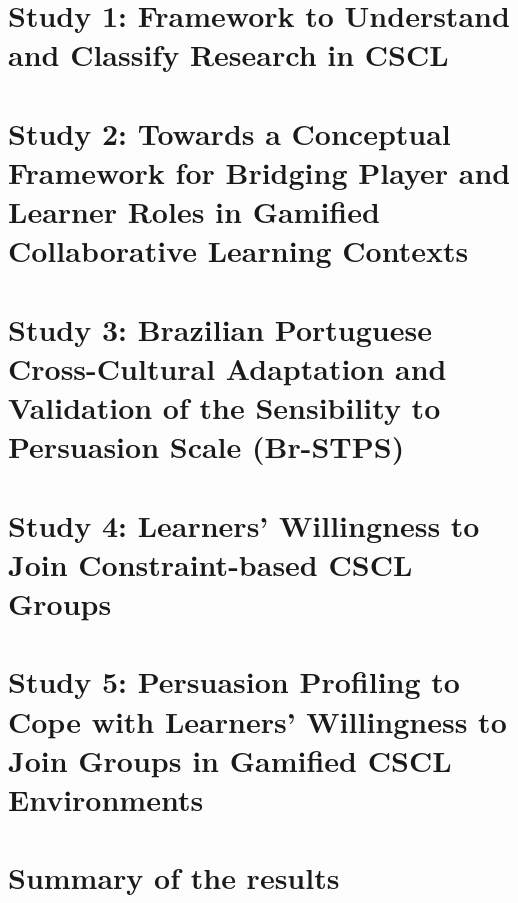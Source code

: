 \section{Study 1: Framework to Understand and Classify Research in CSCL}

\section{Study 2: Towards a Conceptual Framework for Bridging Player and Learner Roles in Gamified Collaborative Learning Contexts}

\section{Study 3: Brazilian Portuguese Cross-Cultural Adaptation and Validation of the Sensibility to Persuasion Scale (Br-STPS)}

\section{Study 4: Learners' Willingness to Join Constraint-based CSCL Groups}

\section{Study 5: Persuasion Profiling to Cope with Learners' Willingness to Join Groups in Gamified CSCL Environments}


\section{Summary of the results}